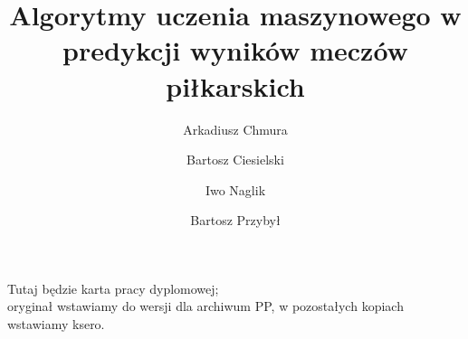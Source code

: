 \documentclass[polish,bachelor,a4paper,oneside]{ppfcmthesis}
\author{%
   Arkadiusz Chmura \album{136690} \and 
   Bartosz Ciesielski \album{136694}\and
   Iwo Naglik \album{136774}\and
   Bartosz Przybył \album{136785}}
\title{Algorytmy uczenia maszynowego w predykcji wyników meczów piłkarskich}
\begin{document}
\frontmatter\pagestyle{empty}%
\maketitle\cleardoublepage%


\thispagestyle{empty}\vspace*{\fill}%
\begin{center}Tutaj będzie karta pracy dyplomowej;\\oryginał wstawiamy do wersji dla archiwum PP, w pozostałych kopiach wstawiamy ksero.\end{center}%
\vfill\cleardoublepage%


\pagestyle{ppfcmthesis}%
\tableofcontents* 
\cleardoublepage %


\mainmatter%









{\raggedright\sloppy\small}


\cleardoublepage\appendix%
\newpage



\ppcolophon
\end{document}
